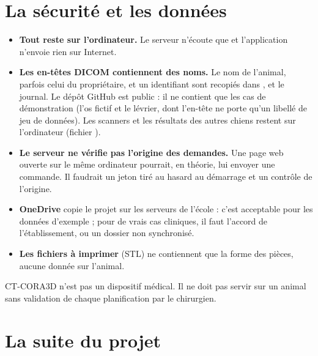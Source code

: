 \section{La sécurité et les données}
\label{sec:securite}

\begin{itemize}
  \item \textbf{Tout reste sur l'ordinateur.} Le serveur n'écoute que  et l'application n'envoie rien
  sur Internet.
  \item \textbf{Les en-têtes DICOM contiennent des noms.} Le nom de l'animal, parfois celui du propriétaire, et un
  identifiant sont recopiés dans ,  et le journal. Le dépôt GitHub est
  public : il ne contient que les cas de démonstration (l'os fictif et le lévrier, dont l'en-tête ne porte qu'un
  libellé de jeu de données). Les scanners et les résultats des autres chiens restent sur l'ordinateur (fichier
  ).
  \item \textbf{Le serveur ne vérifie pas l'origine des demandes.} Une page web ouverte sur le même ordinateur pourrait,
  en théorie, lui envoyer une commande. Il faudrait un jeton tiré au hasard au démarrage et un contrôle de l'origine.
  \item \textbf{OneDrive} copie le projet sur les serveurs de l'école : c'est acceptable pour les données d'exemple ;
  pour de vrais cas cliniques, il faut l'accord de l'établissement, ou un dossier non synchronisé.
  \item \textbf{Les fichiers à imprimer} (STL) ne contiennent que la forme des pièces, aucune donnée sur l'animal.
\end{itemize}

\begin{attention}[title={Un prototype de recherche}]
CT-CORA3D n'est pas un dispositif médical. Il ne doit pas servir sur un animal sans validation de chaque planification
par le chirurgien.
\end{attention}

\section{La suite du projet}

